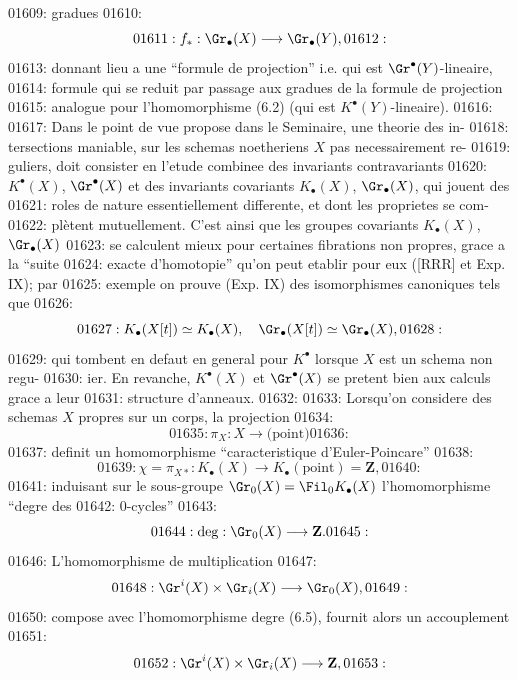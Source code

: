 01609: gradues
01610: \begin{equation}
01611: f_{*}: \Gr_{\bullet}(X) \longrightarrow \Gr_{\bullet}(Y),
01612: \end{equation}
01613: donnant lieu a une ``formule de projection'' i.e. qui est $\Gr^{\bullet}(Y)$-lineaire,
01614: formule qui se reduit par passage aux gradues de la formule de projection
01615: analogue pour l'homomorphisme (6.2) (qui est $K^{\bullet}(Y)$-lineaire).
01616: 
01617: Dans le point de vue propose dans le Seminaire, une theorie des in-
01618: tersections maniable, sur les schemas noetheriens $X$ pas necessairement re-
01619: guliers, doit consister en l'etude combinee des invariants contravariants
01620: $K^{\bullet}(X)$, $\Gr^{\bullet}(X)$ et des invariants covariants $K_{\bullet}(X)$, $\Gr_{\bullet}(X)$, qui jouent des
01621: roles de nature essentiellement differente, et dont les proprietes se com-
01622: pl\`etent mutuellement. C'est ainsi que les groupes covariants $K_{\bullet}(X)$, $\Gr_{\bullet}(X)$
01623: se calculent mieux pour certaines fibrations non propres, grace a la ``suite
01624: exacte d'homotopie'' qu'on peut etablir pour eux ([RRR] et Exp. IX); par
01625: exemple on prouve (Exp. IX) des isomorphismes canoniques tels que
01626: \[
01627: K_{\bullet}(X[t]) \simeq K_{\bullet}(X), \quad \Gr_{\bullet}(X[t]) \simeq \Gr_{\bullet}(X),
01628: \]
01629: qui tombent en defaut en general pour $K^{\bullet}$ lorsque $X$ est un schema non regu-
01630: ier. En revanche, $K^{\bullet}(X)$ et $\Gr^{\bullet}(X)$ se pretent bien aux calculs grace a leur
01631: structure d'anneaux.
01632: 
01633: Lorsqu'on considere des schemas $X$ propres sur un corps, la projection
01634: \[
01635: \pi_X: X \longrightarrow \text{(point)}
01636: \]
01637: definit un homomorphisme ``caracteristique d'Euler-Poincare''
01638: \begin{equation}
01639: \chi = \pi_{X*}: K_{\bullet}(X) \longrightarrow K_{\bullet}(\text{point}) = \mathbf{Z},
01640: \end{equation}
01641: induisant sur le sous-groupe $\Gr_0(X) = \Fil_0 K_{\bullet}(X)$ l'homomorphisme ``degre des
01642: 0-cycles''
01643: \begin{equation}
01644: \deg: \Gr_0(X) \longrightarrow \mathbf{Z}.
01645: \end{equation}
01646: L'homomorphisme de multiplication
01647: \[
01648: \Gr^i(X) \times \Gr_i(X) \longrightarrow \Gr_0(X),
01649: \]
01650: compose avec l'homomorphisme degre (6.5), fournit alors un accouplement
01651: \begin{equation}
01652: \Gr^i(X) \times \Gr_i(X) \longrightarrow \mathbf{Z},
01653: \end{equation}
